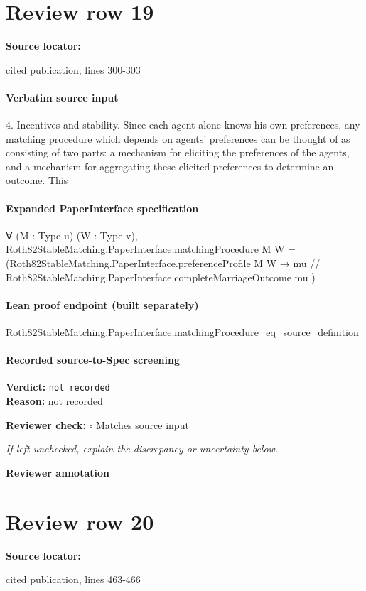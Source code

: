 \documentclass[10pt]{article}
\newcommand{\reviewerbox}{%
  \par\noindent\fbox{\parbox{0.96\linewidth}{\rule{0pt}{0.38in}}}\par
}
\newcommand{\reviewmatch}[1]{%
  \par\noindent\textbf{Reviewer check:} $\square$\; #1\par
  \noindent\emph{If left unchecked, explain the discrepancy or uncertainty below.}\par
}
\begin{document}
\section*{Review row 19}
\textbf{Source locator:} {\footnotesize\raggedright cited publication, lines 300-\allowbreak{}303\par}
\paragraph{Verbatim source input}
\begin{ReviewVerbatim}
4. Incentives and stability. Since each agent alone knows his own preferences, any
matching procedure which depends on agents' preferences can be thought of as
consisting of two parts: a mechanism for eliciting the preferences of the agents, and a
mechanism for aggregating these elicited preferences to determine an outcome. This
\end{ReviewVerbatim}


\paragraph{Expanded PaperInterface specification}
\begin{ReviewVerbatim}
∀ (M : Type u) (W : Type v),
  Roth82StableMatching.PaperInterface.matchingProcedure M W =
    (Roth82StableMatching.PaperInterface.preferenceProfile M W →
      { mu // Roth82StableMatching.PaperInterface.completeMarriageOutcome mu })
\end{ReviewVerbatim}

\paragraph{Lean proof endpoint (built separately)}\begin{ReviewVerbatim}
Roth82StableMatching.PaperInterface.matchingProcedure_eq_source_definition
\end{ReviewVerbatim}

\paragraph{Recorded source-to-Spec screening}
\textbf{Verdict:} \texttt{not recorded}
\\
\textbf{Reason:} not recorded
\reviewmatch{Matches source input}
\noindent\textbf{Reviewer annotation}\par
\reviewerbox
\clearpage
\hypertarget{source-claim-c30c6d5e5f9f5a57}{}
\section*{Review row 20}
\textbf{Source locator:} {\footnotesize\raggedright cited publication, lines 463-\allowbreak{}466\par}
\end{document}
